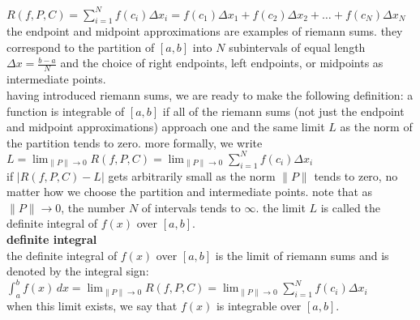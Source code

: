 \documentclass{article}
\begin{document}
$R(f, P, C) = \sum_{i=1}^{N}f(c_i)\Delta x_i = f(c_1)\Delta x_1 + f(c_2)\Delta x_2 + \ldots + f(c_N)\Delta x_N$\\

the endpoint and midpoint approximations are examples of riemann sums. they correspond to the partition of $[a, b]$ into $N$ subintervals of equal length $\Delta x = \frac{b - a}{N}$ and the choice of right endpoints, left endpoints, or midpoints as intermediate points.\\

having introduced riemann sums, we are ready to make the following definition: a function is integrable of $[a, b]$ if all of the riemann sums (not just the endpoint and midpoint approximations) approach one and the same limit $L$ as the norm of the partition tends to zero. more formally, we write\\

$L = \lim_{\lVert P\rVert \to 0}R(f, P, C) = \lim_{\lVert P\rVert \to 0}\sum_{i=1}^{N}f(c_i)\Delta x_i$\\

if $\lvert R(f, P, C) - L\rvert$ gets arbitrarily small as the norm $\lVert P\rVert$ tends to zero, no matter how we choose the partition and intermediate points. note that as $\lVert P\rVert \to 0$, the number $N$ of intervals tends to $\infty$. the limit $L$ is called the definite integral of $f(x)$ over $[a, b]$.\\

\textbf{definite integral}\\
the definite integral of $f(x)$ over $[a, b]$ is the limit of riemann sums and is denoted by the integral sign:\\

$\int_{a}^{b}f(x)\, dx = \lim_{\lVert P\rVert \to 0}R(f, P, C) = \lim_{\lVert P\rVert \to 0}\sum_{i=1}^{N}f(c_i)\Delta x_i$\\

when this limit exists, we say that $f(x)$ is integrable over $[a, b]$.\\
\end{document}
